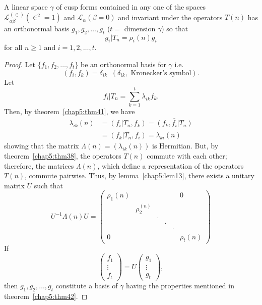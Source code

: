 \begin{thm}\label{chap5:thm42}
A linear space $\gamma$ of cusp forms contained in any one of the
spaces $\mathscr{L}^{(\in)}_{\alpha\beta}(\in^2=1)$ and
$\mathscr{L}_{\alpha}(\beta=0)$ and invariant under the operators
$T(n)$ has an orthonormal basis $g_1,g_2,\ldots, g_t$ ($t=$ dimension
$\gamma$) so that 
$$
g_i|T_n=\rho_i(n)g_i
$$
for all $n\geq 1$ and $i=1,2,\ldots ,t$.
\end{thm}

\begin{proof}
Let $\{f_1,f_2,\ldots, f_t\}$ be an orthonormal basis for $\gamma$
i.e.
$$
(f_i,f_k) =\delta_{ik} \;\;  (\delta_{ik}, \text{ Kronecker's symbol}).
$$
Let 
$$
f_i|T_n = \sum^t_{k=1} \lambda_{ik} f_k.
$$
Then, by theorem~\ref{chap5:thm41}, we have 
\begin{align*}
\lambda_{ik}(n) & = (f_i |T_n, f_k) = \overline{(f_k,f_i|T_n)}\\
& = \overline{(f_k|T_n, f_i)} = \overline{\lambda_{ki}(n)}
\end{align*}
showing that the matrix $\Lambda(n)=(\lambda_{ik}(n))$ is
Hermitian. But, by theorem~\ref{chap5:thm38}, the operators $T(n)$ commute with each
other; therefore, the matrices $\Lambda(n)$, which \pageoriginale
define a representation of the operators $T(n)$, commute
pairwise. Thus, by lemma~\ref{chap5:lem13}, there exists a unitary matrix $U$ such
that 
$$
U^{-1}\Lambda (n) U = \begin{pmatrix}
\rho_1(n) & & & & & 0\\
& \rho_2^{(n)} & & & & \\
& & \cdot & & & \\
& & & \cdot & & \\
& & & & \cdot & \\
0 & & & & & \rho_t(n)
\end{pmatrix}
$$
If
$$
\begin{pmatrix}
f_1\\\vdots\\f_t
\end{pmatrix} = U \begin{pmatrix}
g_1 \\\vdots \\g_t
\end{pmatrix},
$$
then $g_1,g_2,\ldots, g_t$ constitute a basis of $\gamma$ having the
properties mentioned in theorem~\ref{chap5:thm42}.


\end{proof}
